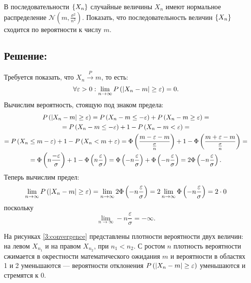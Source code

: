 В последовательности $\left \{ X_n \right \}$ случайные величины $X_n$ имеют нормальное распределение $\mathcal{N} \left ( m, \frac{\sigma^2}{n^2} \right )$.
Показать, что последовательность величин $\left \{ X_n \right \}$ сходится по вероятности к числу $m$.

\subsection*{Решение:}
Требуется показать, что $X_n \stackrel{P}{\longrightarrow} m$, то есть:
\begin{equation}
    \forall \varepsilon > 0: \lim_{n \rightarrow \infty} P \left (  \left |  X_n - m  \right | \ge \varepsilon  \right ) = 0 .
\end{equation}
Вычислим вероятность, стоящую под знаком предела:
\begin{multline}
    P \left ( \left |  X_n - m  \right | \ge \varepsilon \right )
    = P \left ( X_n - m \le - \varepsilon \right ) + P \left ( X_n - m \ge \varepsilon \right ) = \\
    = P \left ( X_n - m \le - \varepsilon \right ) + 1 - P \left ( X_n - m < \varepsilon \right ) = \\
    = P \left ( X_n \le m - \varepsilon \right ) + 1 - P \left ( X_n < m + \varepsilon \right )
    = \Phi \left ( \frac{ m - \varepsilon - m}{\frac{\sigma}{n}} \right ) + 1 - \Phi \left ( \frac{m + \varepsilon - m}{\frac{\sigma}{n}} \right ) = \\
    = \Phi \left ( n \frac{-\varepsilon}{\sigma} \right ) + 1 - \Phi \left ( n \frac{\varepsilon}{\sigma} \right )
    = \Phi \left ( - n \frac{\varepsilon}{\sigma} \right ) + \Phi \left ( - n \frac{\varepsilon}{\sigma} \right )
    = 2 \Phi \left ( - n \frac{\varepsilon}{\sigma} \right ).
\end{multline}
Теперь вычислим предел:
\begin{equation}
    \lim_{n \rightarrow \infty} P \left ( \left |  X_n - m  \right | \ge \varepsilon \right )
    = \lim_{n \rightarrow \infty} 2 \Phi \left ( - n \frac{\varepsilon}{\sigma} \right )
    = 2 \lim_{n \rightarrow \infty} \Phi \left ( - n \frac{\varepsilon}{\sigma} \right )
    = 2 \cdot 0
\end{equation}
поскольку
\begin{equation}
    \lim_{n \rightarrow \infty} - n \frac{\varepsilon}{\sigma} = - \infty .
\end{equation}

На рисунках \ref{3:convergence} представлены плотности вероятности двух величин: на левом $X_{n_1}$ и на правом $X_{n_2}$, при $n_1 < n_2$. С ростом $n$ плотность
вероятности сжимается в окрестности математического ожидания $m$ и вероятности в областях 1 и 2 уменьшаются --- вероятности отклонения
$P \left (  \left |  X_n - m  \right | \ge \varepsilon  \right )$ уменьшаются и стремятся к 0.


